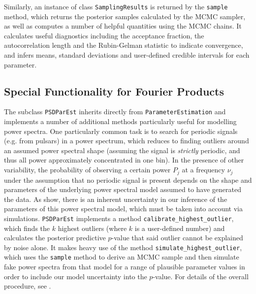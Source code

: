 \documentclass[twocolumn]{aastex62}
\begin{document}

Similarly, an instance of class \verb|SamplingResults| is returned by the \verb|sample| method, which returns the posterior samples calculated by the MCMC sampler, as well as computes a number of helpful quantities using the MCMC chains. It calculates useful diagnostics including the acceptance fraction, the autocorrelation length and the Rubin-Gelman statistic \citep{gelman1992} to indicate convergence, and infers means, standard deviations and user-defined credible intervals for each parameter.


\subsection{Special Functionality for Fourier Products}

The subclass \verb|PSDParEst| inherits directly from \verb|ParameterEstimation| and implements a number of additional methods particularly useful for modelling power spectra. One particularly common task is to search for periodic signals (e.g. from pulsars) in a power spectrum, which reduces to finding outliers around an assumed power spectral shape (assuming the signal is \textit{strictly} periodic, and thus all power approximately concentrated in one bin). In the presence of other variability, the probability of observing a certain power $P_j$ at a frequency $\nu_j$ under the assumption that no periodic signal is present depends on the shape and parameters of the underlying power spectral model assumed to have generated the data. As \citet{vaughan2010} show, there is an inherent uncertainty in our inference of the parameters of this power spectral model, which must be taken into account via simulations. \verb|PSDParEst| implements a method \verb|calibrate_highest_outlier|, which finds the $k$ highest outliers (where $k$ is a user-defined number) and calculates the posterior predictive $p$-value that said outlier cannot be explained by noise alone. It makes heavy use of the method \verb|simulate_highest_outlier|, which uses the \verb|sample| method to derive an MCMC sample and then simulate fake power spectra from that model for a range of plausible parameter values in order to include our model uncertainty into the $p$-value. For details of the overall procedure, see \citet{vaughan2010}. 
\end{document}
